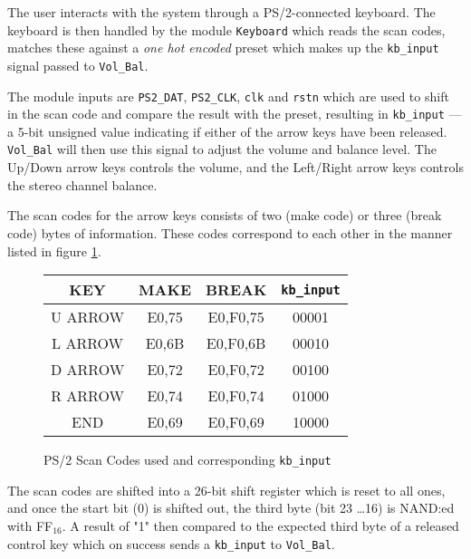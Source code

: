 The user interacts with the system through a PS/2-connected keyboard. The keyboard is then handled by the module \verb?Keyboard? which reads the scan codes, matches these against a \emph{one hot encoded} preset which makes up the \verb?kb_input? signal passed to \verb?Vol_Bal?.

The module inputs are \verb=PS2_DAT=, \verb=PS2_CLK=, \verb=clk= and \verb=rstn= which are used to shift in the scan code and compare the result with the preset, resulting in \verb=kb_input= --- a 5-bit unsigned value indicating if either of the arrow keys have been released. \verb=Vol_Bal= will then use this signal to adjust the volume and balance level. The Up/Down arrow keys controls the volume, and the Left/Right arrow keys controls the stereo channel balance.

The scan codes for the arrow keys consists of two (make code) or three (break code) bytes of information. These codes correspond to each other in the manner listed in figure \ref{fig:scancodes}. 

\begin{figure}[h]
\centering
\caption{PS/2 Scan Codes used and corresponding \texttt{kb\_input}}
\begin{tabular}{|c|c|c|c|}
\hline
KEY & MAKE & BREAK & \verb+kb_input+\\ \hline
U ARROW & E0,75 & E0,F0,75 & 00001\\ \hline
L ARROW & E0,6B & E0,F0,6B & 00010\\ \hline
D ARROW & E0,72 & E0,F0,72 & 00100\\ \hline
R ARROW & E0,74 & E0,F0,74 & 01000\\ \hline
END		& E0,69 & E0,F0,69 & 10000\\ \hline
\end{tabular}
\label{fig:scancodes}
\end{figure}

The scan codes are shifted into a 26-bit shift register which is reset to all ones, and once the start bit (0) is shifted out, the third byte (bit 23 \ldots 16) is NAND:ed with FF$_{16}$. A result of "1" then compared to the expected third byte of a released control key which on success sends a \verb+kb_input+ to \verb+Vol_Bal+.
